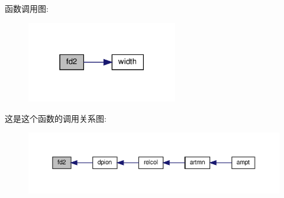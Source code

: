 函数调用图\+:
\nopagebreak
\begin{figure}[H]
\begin{center}
\leavevmode
\includegraphics[width=186pt]{fd2_8f90_a7f6e9cf572c13e1d90b79be2f7fb6e3f_cgraph}
\end{center}
\end{figure}
这是这个函数的调用关系图\+:
\nopagebreak
\begin{figure}[H]
\begin{center}
\leavevmode
\includegraphics[width=350pt]{fd2_8f90_a7f6e9cf572c13e1d90b79be2f7fb6e3f_icgraph}
\end{center}
\end{figure}
